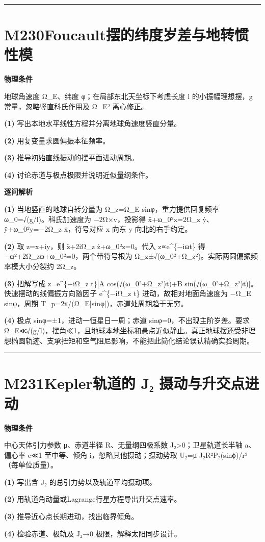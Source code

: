 \documentclass[UTF8,a4paper,11pt,oneside,openany]{ctexbook}
\begin{document}
\par\bigskip\hrule\bigskip
\section*{M230\quad Foucault摆的纬度岁差与地转惯性模}
\textbf{物理条件}\par 地球角速度 Ω\_E、纬度 φ；在局部东北天坐标下考虑长度 l 的小振幅理想摆，g 常量，忽略竖直科氏作用及 Ω\_E² 离心修正。
\par\noindent\textbf{(1)} 写出本地水平线性方程并分离地球角速度竖直分量。
\par\noindent\textbf{(2)} 用复变量求圆偏振本征频率。
\par\noindent\textbf{(3)} 推导初始直线振动的摆平面进动周期。
\par\noindent\textbf{(4)} 讨论赤道与极点极限并说明近似量纲条件。

\par\medskip\noindent\textbf{逐问解析}
\par\noindent\textbf{(1)} 当地竖直的地球自转分量为 Ω\_z=Ω\_E sinφ，重力提供回复频率 ω\_0=√(g/l)。科氏加速度为 −2Ω×v，投影得 ẍ+ω\_0²x=2Ω\_z ẏ、ÿ+ω\_0²y=−2Ω\_z ẋ，符号对应 x 向东 y 向北的右手约定。
\par\noindent\textbf{(2)} 取 z=x+iy，则 z̈+2iΩ\_z ż+ω\_0²z=0。代入 z∝e\textasciicircum{}\{−iωt\} 得 −ω²+2Ω\_zω+ω\_0²=0，两个带符号根为 Ω\_z±√(ω\_0²+Ω\_z²)。实际两圆偏振频率模大小分裂约 2Ω\_z。
\par\noindent\textbf{(3)} 把解写成 z=e\textasciicircum{}\{−iΩ\_z t\}[A cos(√(ω\_0²+Ω\_z²)t)+B sin(√(ω\_0²+Ω\_z²)t)]。快速摆动的线偏振方向随因子 e\textasciicircum{}\{−iΩ\_z t\} 进动，故相对地面角速度为 −Ω\_E sinφ，周期 T\_p=2π/(Ω\_E|sinφ|)，赤道处周期趋于无穷。
\par\noindent\textbf{(4)} 极点 sinφ=±1，进动一恒星日一周；赤道 sinφ=0，不出现主阶岁差。要求 Ω\_E≪√(g/l)，摆角≪1，且地球本地坐标和悬点近似静止。真正地球摆还受非理想椭圆轨迹、支承扭矩和空气阻尼影响，不能把此简化结论误认精确实验周期。

\par\bigskip\hrule\bigskip
\section*{M231\quad Kepler轨道的 J₂ 摄动与升交点进动}
\textbf{物理条件}\par 中心天体引力参数 μ、赤道半径 R、无量纲四极系数 J₂>0；卫星轨道长半轴 a、偏心率 e≪1 至中等、倾角 i，忽略其他摄动；摄动势取 U₂=μ J₂R²P₂(sinϕ)/r³（每单位质量）。
\par\noindent\textbf{(1)} 写出含 J₂ 的总引力势以及轨道平均摄动项。
\par\noindent\textbf{(2)} 用轨道角动量或Lagrange行星方程导出升交点速率。
\par\noindent\textbf{(3)} 推导近心点长期进动，找出临界倾角。
\par\noindent\textbf{(4)} 检验赤道、极轨及 J₂→0 极限，解释太阳同步设计。
\end{document}
